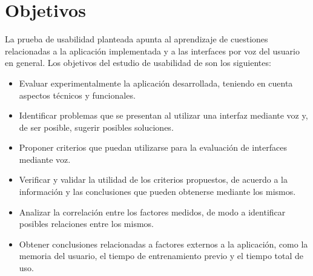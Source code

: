 \section{Objetivos}
\label{sec:objetivos-estudio}

La prueba de usabilidad planteada apunta al aprendizaje de cuestiones relacionadas
a la aplicaci\'on implementada y a las interfaces por voz del usuario en general.
Los objetivos del estudio de usabilidad de 
son los siguientes:

\begin{itemize}
	\item Evaluar experimentalmente la aplicaci\'on desarrollada, teniendo en cuenta 
	aspectos t\'ecnicos y funcionales.
	\item Identificar problemas que se presentan al utilizar una interfaz mediante voz y,
	 de ser posible, sugerir posibles soluciones.
	\item Proponer criterios que puedan utilizarse para la evaluaci\'on de interfaces 
	mediante voz.
	\item Verificar y validar la utilidad de los criterios propuestos, de acuerdo a 
	la informaci\'on y las conclusiones que pueden obtenerse mediante los mismos.
	\item Analizar la correlaci\'on entre los factores medidos, de modo a identificar
	posibles relaciones entre los mismos. 
	\item Obtener conclusiones relacionadas a factores externos a la aplicaci\'on, 
	como la memoria del usuario, el tiempo de entrenamiento previo y el tiempo
	total de uso.
\end{itemize}